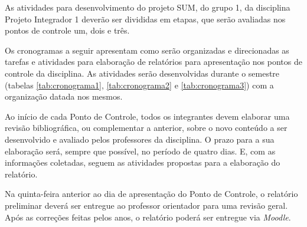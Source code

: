 As atividades para desenvolvimento do projeto SUM, do grupo 1, da disciplina Projeto Integrador 1 deverão ser divididas em etapas, que serão avaliadas nos pontos de controle um, dois e três.

Os cronogramas a seguir apresentam como serão organizadas e direcionadas  as tarefas e atividades para elaboração de relatórios para apresentação nos pontos de controle da disciplina. As atividades serão desenvolvidas durante o semestre (tabelas \ref{tab:cronograma1}, \ref{tab:cronograma2} e \ref{tab:cronograma3}) com a organização datada nos mesmos.

Ao início de cada Ponto de Controle, todos os integrantes devem elaborar uma revisão bibliográfica, ou complementar a anterior, sobre o novo conteúdo a ser desenvolvido e avaliado pelos professores da disciplina. O prazo para a sua elaboração será, sempre que possível, no período de quatro dias. E, com as informações coletadas, seguem as atividades propostas para a elaboração do relatório.

Na quinta-feira anterior ao dia de apresentação do Ponto de Controle, o relatório preliminar deverá ser entregue ao professor orientador para uma revisão geral. Após as correções feitas pelos anos,  o relatório poderá  ser entregue via \textit{Moodle}.

